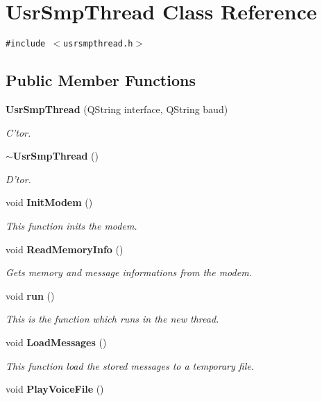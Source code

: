 \section{Usr\-Smp\-Thread Class Reference}
\label{classUsrSmpThread}
{\tt \#include $<$usrsmpthread.h$>$}

\subsection*{Public Member Functions}
\begin{CompactItemize}
\item 
{\bf Usr\-Smp\-Thread} (QString interface, QString baud)
\begin{CompactList}\small\item\em C'tor. \item\end{CompactList}\item 
{\bf $\sim$Usr\-Smp\-Thread} ()
\begin{CompactList}\small\item\em D'tor. \item\end{CompactList}\item 
void {\bf Init\-Modem} ()
\begin{CompactList}\small\item\em This function inits the modem. \item\end{CompactList}\item 
void {\bf Read\-Memory\-Info} ()
\begin{CompactList}\small\item\em Gets memory and message informations from the modem. \item\end{CompactList}\item 
void {\bf run} ()\label{classUsrSmpThread_a4}

\begin{CompactList}\small\item\em This is the function which runs in the new thread. \item\end{CompactList}\item 
void {\bf Load\-Messages} ()
\begin{CompactList}\small\item\em This function load the stored messages to a temporary file. \item\end{CompactList}\item 
void {\bf Play\-Voice\-File} ()\label{classUsrSmpThread_a6}


\end{CompactItemize}
